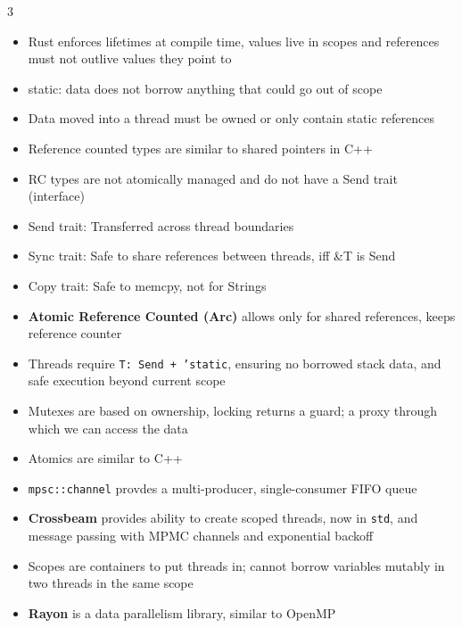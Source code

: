 \documentclass[10pt, landscape]{article}
\begin{document}
\begin{multicols*}{3}
\begin{itemize}
    \item Rust enforces lifetimes at compile time, values live in scopes and references must not outlive values they point to
    \item static: data does not borrow anything that could go out of scope
    \item Data moved into a thread must be owned or only contain static references
    \item Reference counted types are similar to shared pointers in C++
    \item RC types are not atomically managed and do not have a Send trait (interface)
    \item Send trait: Transferred across thread boundaries
    \item Sync trait: Safe to share references between threads, iff \&T is Send
    \item Copy trait: Safe to memcpy, not for Strings
    \item \textbf{Atomic Reference Counted (Arc)} allows only for shared references, keeps reference counter
    \item Threads require \texttt{T: Send + 'static}, ensuring no borrowed stack data, and safe execution beyond current scope
    \item Mutexes are based on ownership, locking returns a guard; a proxy through which we can access the data
    \item Atomics are similar to C++
    \item \texttt{mpsc::channel} provdes a multi-producer, single-consumer FIFO queue
    \item \textbf{Crossbeam} provides ability to create scoped threads, now in \texttt{std}, and message passing with MPMC channels and exponential backoff
    \item Scopes are containers to put threads in; cannot borrow variables mutably in two threads in the same scope
    \item \textbf{Rayon} is a data parallelism library, similar to OpenMP
\end{itemize}


\end{multicols*}
\end{document}
